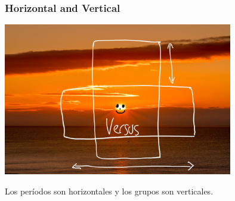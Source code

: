 \documentclass{beamer}
\begin{document}
\begin{frame}
    \frametitle{Horizontal and Vertical}
    \includegraphics[width=10cm]{../../../../public/images/hor_vert.jpg}

    \onslide Los períodos son
    \pause \alert{horizontales}
    \onslide y los grupos son
    \pause \alert{verticales}.
\end{frame}
\end{document}
